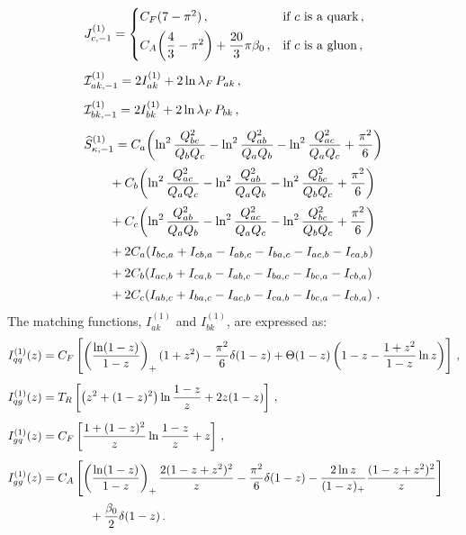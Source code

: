 \begin{subequations}
\label{eq:Cd1-ingred}
\begin{align}
&J_{c,-1}^{(1)} = \begin{cases}
    C_F(7-\pi^2)\,, & \text{if $c$ is a quark}\,, \\[4pt]
    C_A\!\left(\dfrac{4}{3}-\pi^2\right)+\dfrac{20}{3}\pi\beta_0\,, &\text{if $c$ is a gluon}\,,
\end{cases} \\[1ex]
&\mathcal{I}_{ak,-1}^{(1)} = 2I_{ak}^{(1)}+2\ln\lambda_F\,P_{ak}\,, \\[1ex]
&\mathcal{I}_{bk,-1}^{(1)} = 2I_{bk}^{(1)}+2\ln\lambda_F\,P_{bk}\,, \\[1ex]
&\widehat{S}_{\kappa,-1}^{(1)}
  = C_a\!\left(\ln^2\frac{Q_{bc}^2}{Q_b Q_c}
     -\ln^2\frac{Q_{ab}^2}{Q_a Q_b}
     -\ln^2\frac{Q_{ac}^2}{Q_a Q_c}+\frac{\pi^2}{6}\right) \notag\\[0.5ex]
  &\qquad+C_b\!\left(\ln^2\frac{Q_{ac}^2}{Q_a Q_c}
     -\ln^2\frac{Q_{ab}^2}{Q_a Q_b}
     -\ln^2\frac{Q_{bc}^2}{Q_b Q_c}+\frac{\pi^2}{6}\right) \notag\\[0.5ex]
  &\qquad+C_c\!\left(\ln^2\frac{Q_{ab}^2}{Q_a Q_b}
     -\ln^2\frac{Q_{ac}^2}{Q_a Q_c}
     -\ln^2\frac{Q_{bc}^2}{Q_b Q_c}+\frac{\pi^2}{6}\right) \notag\\[0.5ex]
  &\qquad+2C_a\!\left(I_{bc,a}+I_{cb,a}-I_{ab,c}-I_{ba,c}-I_{ac,b}-I_{ca,b}\right) \notag\\[0.5ex]
  &\qquad+2C_b\!\left(I_{ac,b}+I_{ca,b}-I_{ab,c}-I_{ba,c}-I_{bc,a}-I_{cb,a}\right) \notag\\[0.5ex]
  &\qquad+2C_c\!\left(I_{ab,c}+I_{ba,c}-I_{ac,b}-I_{ca,b}-I_{bc,a}-I_{cb,a}\right)\,.
\end{align}
\end{subequations}
The matching functions, $I_{ak}^{(1)}$ and $I_{bk}^{(1)}$, are expressed as:
\begin{subequations}
\begin{align}
  I^{(1)}_{qq}(z) &=C_F\left[ \left(\frac{\ln(1-z)}{1-z}\right)_+(1+z^2)
  -\frac{\pi^2}{6}\delta(1-z)+\Theta(1-z)\left(1-z-\frac{1+z^2}{1-z}\ln z\right)\right]\,,\\[1ex]
  I^{(1)}_{qg}(z) &= T_R\left[\left(z^2+(1-z)^2\right)\ln\frac{1-z}{z}
  +2z(1-z)\right]\,,\\[1ex]
  I^{(1)}_{gq}(z) &= C_F\left[\frac{1+(1-z)^2}{z}\ln\frac{1-z}{z}+z\right]\,,\\[1ex]
  I^{(1)}_{gg}(z) &= C_A\left[\left(\frac{\ln(1-z)}{1-z}\right)_+\frac{2(1-z+z^2)^2}{z}-\frac{\pi^2}{6}\delta(1-z)-\frac{2\ln z}{(1-z)_+}\frac{(1-z+z^2)^2}{z}\right]\notag\\[0.5ex]
  &\qquad\qquad+\frac{\beta_0}{2}\delta(1-z)\,.
\end{align}
\end{subequations}

